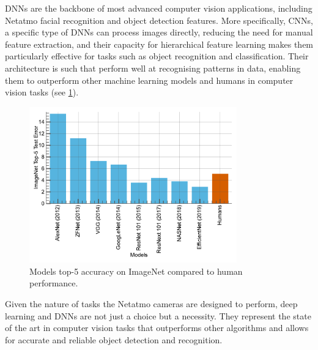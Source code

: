 \acp{DNN} are the backbone of most advanced computer vision applications,
including Netatmo facial recognition and object detection features. More
specifically, \acp{CNN}, a specific type of \acp{DNN} can process images
directly, reducing the need for manual feature extraction, and their capacity
for hierarchical feature learning makes them particularly effective for tasks
such as object recognition and classification. Their architecture is such that
\DIFaddbegin {}\DIFaddend perform well at recognising patterns in \DIFdelbegin {}\DIFdelend \DIFaddbegin {}\DIFaddend data, enabling them to outperform other machine learning models and humans in
computer vision tasks (see \cref{fig:intro:models_vs_humans}).\\

\begin{figure}[htbp]
      \centering
      \includegraphics[width=0.8\textwidth]{chapter_intro/assets/models_vs_human.pdf}
      \caption{Models top-5 accuracy on ImageNet \cite{deng2009imagenet} compared
            to human performance.}
      \label{fig:intro:models_vs_humans}
\end{figure}

Given the nature of tasks the Netatmo cameras are designed to perform, deep
learning and \aclp{DNN} are not just a choice but a necessity. They represent
the state of the art in computer vision tasks that outperforms other algorithms
and allows for accurate and reliable object detection and recognition.\\

\DIFaddbegin \section{}
\DIFaddend 

